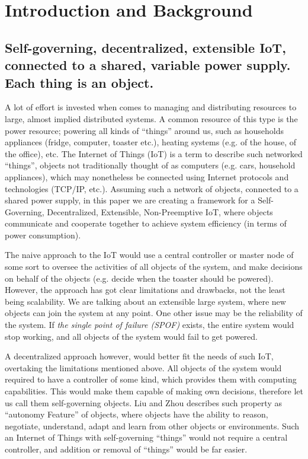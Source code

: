 \documentclass[../main/IoT.tex]{subfiles}
\begin{document}
\section{Introduction and Background}\label{intro}
\subsection{Self-governing, decentralized, extensible IoT, connected to a shared, variable power supply. Each thing is an object.}
A lot of effort is invested when comes to managing and distributing resources to large, almost implied distributed systems. A common resource of this type is the power resource; powering all kinds of ``things'' around us, such as households appliances (fridge, computer, toaster etc.), heating systems (e.g. of the house, of the office), etc. The Internet of Things (IoT) is a term to describe such networked ``things'', objects not traditionally thought of as computers (e.g. cars, household appliances), which may nonetheless be connected using Internet protocols and technologies (TCP/IP, etc.). Assuming such a network of objects, connected to a shared power supply, in this paper we are creating a framework for a Self-Governing, Decentralized, Extensible, Non-Preemptive IoT, where objects communicate and cooperate together to achieve system efficiency (in terms of power consumption).

The naive approach to the IoT would use a central controller or master node of some sort to oversee the activities of all objects of the system, and make decisions on behalf of the objects (e.g. decide when the toaster should be powered). However, the approach has got clear limitations and drawbacks, not the least being scalability. We are talking about an extensible large system, where new objects can join the system at any point. One other issue may be the reliability of the system. If \emph{the single point of failure (SPOF)} exists, the entire system would stop working, and all objects of the system would fail to get powered.

A decentralized approach however, would better fit the needs of such IoT, overtaking the limitations mentioned above. All objects of the system would required to have a controller of some kind, which provides them with computing capabilities. This would make them capable of making own decisions, therefore let us call them self-governing objects. Liu and Zhou \cite{IoT6150221} describes such property as ``autonomy Feature'' of objects, where objects have the ability to reason, negotiate, understand, adapt and learn from other objects or environments. Such an Internet of Things with self-governing ``things'' would not require a central controller, and addition or removal of ``things'' would be far easier.
\end{document}

